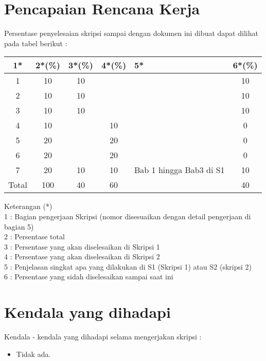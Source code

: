\documentclass[a4paper,twoside]{article}
\begin{document}
\section{Pencapaian Rencana Kerja}
Persentase penyelesaian skripsi sampai dengan dokumen ini dibuat dapat dilihat pada tabel berikut :

\begin{center}
  \begin{tabular}{ | c | c | c | c | l | c |}
    \hline
    1*  & 2*(\%) & 3*(\%) & 4*(\%) &5* &6*(\%)\\ \hline \hline
    1   & 10 & 10 &  &  & 10 \\ \hline
    2   & 10 & 10 &  &  & 10 \\ \hline
    3   & 10 & 10 &  &  & 10 \\ \hline
    4   & 10 &  & 10 &  & 0 \\ \hline
    5   & 20 &  & 20 &  & 0 \\ \hline
    6   & 20 &  & 20 &  & 0\\\hline
    7   & 20 & 10 & 10 & {\footnotesize Bab 1 hingga Bab3 di S1} & 10 \\ \hline
    Total  & 100  & 40  & 60 &  & 40\\ \hline
                          \end{tabular}
\end{center}

Keterangan (*)\\
1 : Bagian pengerjaan Skripsi (nomor disesuaikan dengan detail pengerjaan di bagian 5)\\
2 : Persentase total \\
3 : Persentase yang akan diselesaikan di Skripsi 1 \\
4 : Persentase yang akan diselesaikan di Skripsi 2 \\
5 : Penjelasan singkat apa yang dilakukan di S1 (Skripsi 1) atau S2 (skripsi 2)\\
6 : Persentase yang sidah diselesaikan sampai saat ini 

\section{Kendala yang dihadapi}
Kendala - kendala yang dihadapi selama mengerjakan skripsi :
\begin{itemize}
	\item Tidak ada.
\end{itemize}
\end{document}
